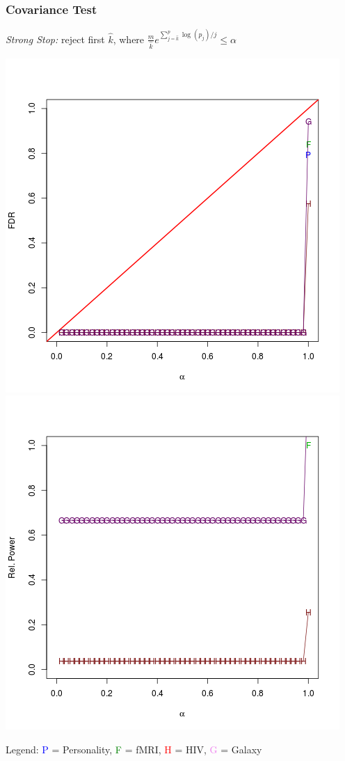 \documentclass{beamer}
\begin{document}
\begin{frame}
\frametitle{Covariance Test}
\emph{Strong Stop:} reject first $\hat{k}$, where $\frac{m}{\hat{k}}e^{\sum_{j=\hat{k}}^{p} \log(p_j)/j} \leq \alpha$

\begin{center}
\includegraphics[scale = 0.3]{ress_c_ss_type1.png}
\includegraphics[scale = 0.3]{ress_c_ss_power.png}
\end{center}

Legend: \textcolor{blue}{P} = Personality, \textcolor{green}{F} = fMRI,
\textcolor{red}{H} = HIV, \textcolor{violet}{G} = Galaxy
\end{frame}
\end{document}
